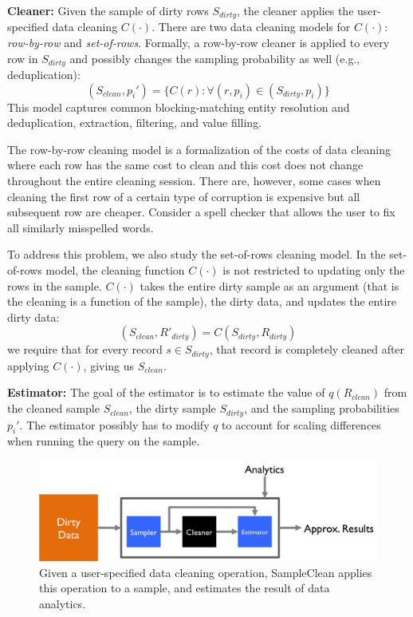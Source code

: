\vspace{0.5em}
\noindent\textbf{Cleaner: }
Given the sample of dirty rows $S_{dirty}$,  the cleaner applies the user-specified data cleaning $C(\cdot)$. There are two data cleaning models for $C(\cdot)$: \emph{row-by-row} and \emph{set-of-rows}.
Formally, a row-by-row cleaner is applied to every row in $S_{dirty}$ and possibly changes the sampling probability as well (e.g., deduplication):
\[
(S_{clean},p_i') = \{C(r) : \forall (r,p_i) \in (S_{dirty},p_i)\}
\]
This model captures common blocking-matching entity resolution and deduplication, extraction, filtering, and value filling.

The row-by-row cleaning model is a formalization of the costs of data cleaning where each row has the same cost to clean and this cost does not change throughout the entire cleaning session.
There are, however, some cases when cleaning the first row of a certain type of corruption is expensive but all subsequent row are cheaper.
Consider a spell checker that allows the user to fix all similarly misspelled words. 

To address this problem, we also study the set-of-rows cleaning model.
In the set-of-rows model, the cleaning function $C(\cdot)$ is not restricted to updating only the rows in the sample.
$C(\cdot)$ takes the entire dirty sample as an argument (that is the cleaning is a function of the sample), the dirty data, and updates the entire dirty data:
\[
(S_{clean}, R'_{dirty}) = C(S_{dirty},R_{dirty})
\]
we require that for every record $s \in S_{dirty}$, that record is completely cleaned after applying $C(\cdot)$, giving us $S_{clean}$.

\vspace{0.5em}
\noindent\textbf{Estimator: } The goal of the estimator is to estimate the value of $q(R_{clean})$ from the cleaned sample $S_{clean}$, the dirty sample $S_{dirty}$, and the sampling probabilities $p_i'$. The estimator possibly has to modify $q$ to account for scaling differences when running the query on the sample.

\begin{figure}
\includegraphics[width=.5\columnwidth]{figs/arch.png}
\caption{Given a user-specified data cleaning operation, SampleClean applies this operation to a sample, and estimates the result of data analytics. \label{fig:arch}}
\end{figure}

